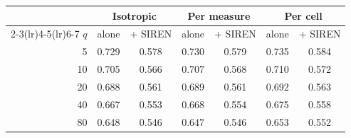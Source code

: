 \begin{tabular}{rcccccc}
\toprule
 & \multicolumn{2}{c}{Isotropic} & \multicolumn{2}{c}{Per measure} & \multicolumn{2}{c}{Per cell} \\
\cmidrule(lr){2-3}\cmidrule(lr){4-5}\cmidrule(lr){6-7}
$q$ & alone & + SIREN & alone & + SIREN & alone & + SIREN \\
\midrule
5 & 0.729 & 0.578 & 0.730 & 0.579 & 0.735 & 0.584 \\
10 & 0.705 & 0.566 & 0.707 & 0.568 & 0.710 & 0.572 \\
20 & 0.688 & 0.561 & 0.689 & 0.561 & 0.692 & 0.563 \\
40 & 0.667 & 0.553 & 0.668 & 0.554 & 0.675 & 0.558 \\
80 & 0.648 & 0.546 & 0.647 & 0.546 & 0.653 & 0.552 \\
\bottomrule
\end{tabular}
